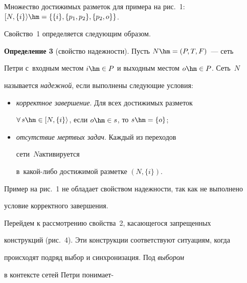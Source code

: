   

  Множество достижимых разметок для примера на рис.~1: $[N,\{i\}\rangle \hm= 

\{\{i\}, \{p_1,p_2\},\{p_2,o\}\}$.

  

  Свойство~1 определяется следующим образом.

  

  \smallskip

  

  \noindent

  \textbf{Определение 3} (свойство надежности). Пусть $N\hm=(P,T,F)$~--- сеть 

Петри с~входным местом $i\hm\in P$ и выходным местом $o\hm\in P$. Сеть~$N$ 

называется \textit{надежной}, если выполнены следующие условия:

  \begin{itemize}

\item \textit{корректное завершение}. Для всех достижимых разметок 

$\forall\,s\hm\in [N,\{i\}\rangle$, если $o\hm\in s$, то $s\hm=\{o\}$;

\item \textit{отсутствие мертвых задач}. Каждый из переходов 

сети~$N$активируется  

в~ка\-кой-ли\-бо достижимой разметке $(N,\{i\})$.

\end{itemize}



  Пример на рис.~1 не обладает свойством надежности, так как не выполнено 

условие корректного завершения.

  

  Перейдем к рассмотрению свойства~2, касающегося запрещенных 

конструкций (рис.~4). Эти конструкции соответствуют ситуациям, когда 

происходят подряд выбор и синхронизация. Под \textit{выбором} 

в контексте сетей Петри понима\-ет-\linebreak

\vspace*{-12pt}





